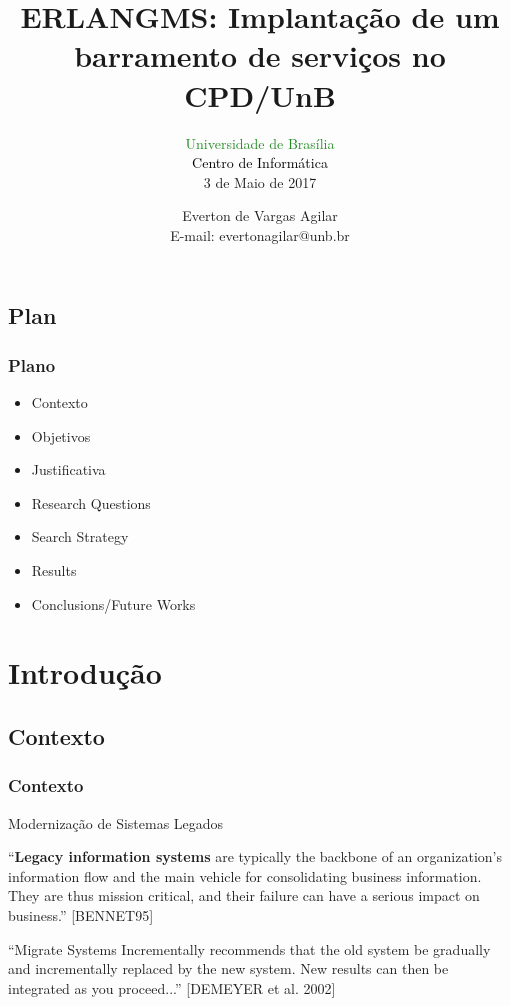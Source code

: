\documentclass{beamer}
\title{ERLANGMS: Implantação de um barramento de serviços no CPD/UnB}
\subtitle{ \textcolor{forestgreen}{Universidade de Brasília} \\
			\textcolor{black}{Centro de Informática} \\
			3 de Maio de 2017
}
\author{Everton de Vargas Agilar \\
		E-mail: evertonagilar@unb.br
}
\begin{document}
\begin{frame}
  \titlepage
\end{frame}








\subsection{Plan}

\begin{frame}
  \frametitle{Plano}

    \begin{itemize}
  	  \item<1-> Contexto
   	  \item<1-> Objetivos
    	  \item<1-> Justificativa
  	  \item<1-> Research Questions
  	  \item<1-> Search Strategy
  	  \item<1-> Results
   	  \item<1-> Conclusions/Future Works
    \end{itemize}

\end{frame}








\section{Introdução}


\subsection{Contexto}


\begin{frame}
  \frametitle{Contexto}

  \begin{exampleblock}{Modernização de Sistemas Legados}
  
  “\textbf{Legacy information systems} are typically the
	backbone of an organization’s information flow
	and the main vehicle for consolidating business
	information. They are thus mission critical, and
	their failure can have a serious impact on
	business.” [BENNET95]

	\vspace{0.5cm} 

	“Migrate Systems Incrementally recommends that the old system be
	gradually and incrementally replaced by the new system. New
	results can then be integrated as you proceed...” [DEMEYER et al. 2002]
  \end{exampleblock}

  
\end{frame}
\end{document}
